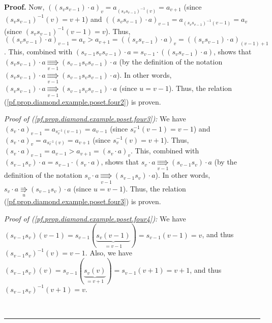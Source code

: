 \documentclass[numbers=enddot,12pt,final,onecolumn,notitlepage]{scrartcl}%
\theoremstyle{definition}
\newenvironment{proof}[1][Proof]{\noindent\textbf{#1.} }{\ \rule{0.5em}{0.5em}}
\newenvironment{verlong}{}{}
\begin{document}
\begin{proof}
\begin{verlong}
Now, $\left(  \left(  s_{v}s_{v-1}\right)  \cdot a\right)  _{v}=a_{\left(
s_{v}s_{v-1}\right)  ^{-1}\left(  v\right)  }=a_{v+1}$ (since $\left(
s_{v}s_{v-1}\right)  ^{-1}\left(  v\right)  =v+1$) and $\left(  \left(
s_{v}s_{v-1}\right)  \cdot a\right)  _{v-1}=a_{\left(  s_{v}s_{v-1}\right)
^{-1}\left(  v-1\right)  }=a_{v}$ (since $\left(  s_{v}s_{v-1}\right)
^{-1}\left(  v-1\right)  =v$). Thus, $\left(  \left(  s_{v}s_{v-1}\right)
\cdot a\right)  _{v-1}=a_{v}>a_{v+1}=\left(  \left(  s_{v}s_{v-1}\right)
\cdot a\right)  _{v}=\left(  \left(  s_{v}s_{v-1}\right)  \cdot a\right)
_{\left(  v-1\right)  +1}$. This, combined with $\left(  s_{v-1}s_{v}%
s_{v-1}\right)  \cdot a=s_{v-1}\cdot\left(  \left(  s_{v}s_{v-1}\right)  \cdot
a\right)  $, shows that $\left(  s_{v}s_{v-1}\right)  \cdot
a\underset{v-1}{\Rrightarrow}\left(  s_{v-1}s_{v}s_{v-1}\right)  \cdot a$ (by
the definition of the notation $\left(  s_{v}s_{v-1}\right)  \cdot
a\underset{v-1}{\Rrightarrow}\left(  s_{v-1}s_{v}s_{v-1}\right)  \cdot a$). In
other words, $\left(  s_{v}s_{v-1}\right)  \cdot a\underset{v-1}{\Rrightarrow
}\left(  s_{v-1}s_{v}s_{v-1}\right)  \cdot a$ (since $u=v-1$). Thus, the
relation (\ref{pf.prop.diamond.example.poset.four2}) is proven.

\textit{Proof of (\ref{pf.prop.diamond.example.poset.four3}):} We have
$\left(  s_{v}\cdot a\right)  _{v-1}=a_{s_{v}^{-1}\left(  v-1\right)
}=a_{v-1}$ (since $s_{v}^{-1}\left(  v-1\right)  =v-1$) and $\left(
s_{v}\cdot a\right)  _{v}=a_{s_{v}^{-1}\left(  v\right)  }=a_{v+1}$ (since
$s_{v}^{-1}\left(  v\right)  =v+1$). Thus, $\left(  s_{v}\cdot a\right)
_{v-1}=a_{v-1}>a_{v+1}=\left(  s_{v}\cdot a\right)  _{v}$. This, combined with
$\left(  s_{v-1}s_{v}\right)  \cdot a=s_{v-1}\cdot\left(  s_{v}\cdot a\right)
$, shows that $s_{v}\cdot a\underset{v-1}{\Rrightarrow}\left(  s_{v-1}%
s_{v}\right)  \cdot a$ (by the definition of the notation $s_{v}\cdot
a\underset{v-1}{\Rrightarrow}\left(  s_{v-1}s_{v}\right)  \cdot a$). In other
words, $s_{v}\cdot a\underset{u}{\Rrightarrow}\left(  s_{v-1}s_{v}\right)
\cdot a$ (since $u=v-1$). Thus, the relation
(\ref{pf.prop.diamond.example.poset.four3}) is proven.

\textit{Proof of (\ref{pf.prop.diamond.example.poset.four4}):} We have
$\left(  s_{v-1}s_{v}\right)  \left(  v-1\right)  =s_{v-1}\left(
\underbrace{s_{v}\left(  v-1\right)  }_{=v-1}\right)  =s_{v-1}\left(
v-1\right)  =v$, and thus $\left(  s_{v-1}s_{v}\right)  ^{-1}\left(  v\right)
=v-1$. Also, we have $\left(  s_{v-1}s_{v}\right)  \left(  v\right)
=s_{v-1}\left(  \underbrace{s_{v}\left(  v\right)  }_{=v+1}\right)
=s_{v-1}\left(  v+1\right)  =v+1$, and thus $\left(  s_{v-1}s_{v}\right)
^{-1}\left(  v+1\right)  =v$.


\end{verlong}
\end{proof}
\end{document}
